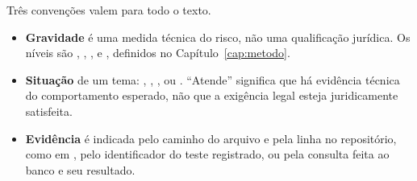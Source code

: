 Três convenções valem para todo o texto.

\begin{itemize}
  \item \textbf{Gravidade} é uma medida técnica do risco, não uma qualificação jurídica. Os níveis são , , ,  e , definidos no Capítulo~\ref{cap:metodo}.
  \item \textbf{Situação} de um tema: , , ,  ou . \enquote{Atende} significa que há evidência técnica do comportamento esperado, não que a exigência legal esteja juridicamente satisfeita.
  \item \textbf{Evidência} é indicada pelo caminho do arquivo e pela linha no repositório, como em , pelo identificador do teste registrado, ou pela consulta feita ao banco e seu resultado.
\end{itemize}
